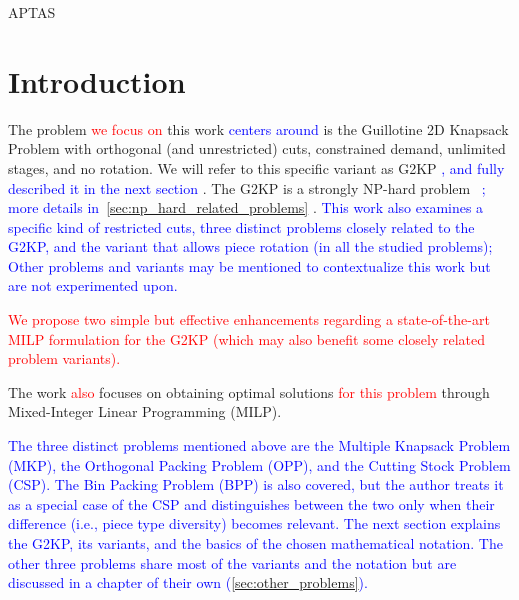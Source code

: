 \documentclass[ppgc,tese,english,formais,babel]{iiufrgs}
\newif\iffinalversion
\newcommand{\newtext}[1]{\iffinalversion%
#1%
\else%
\textcolor{blue}{#1}%
\fi%
}
\newcommand{\oldtext}[1]{\iffinalversion%
\else%
\textcolor{red}{#1}%
\fi%
}
\begin{document}

\listoftables

\begin{listofabbrv}{APTAS}

\end{listofabbrv}


\tableofcontents


\chapter{Introduction}

The problem \oldtext{we focus on} this work \newtext{centers around} is the Guillotine 2D Knapsack Problem with orthogonal (and unrestricted) cuts, constrained demand, unlimited stages, and no rotation.
We will refer to this specific variant as G2KP\newtext{, and fully described it in the next section}.
The G2KP is a strongly NP-hard problem~\newtext{\citep{korf:initial:2003,dolatabadi:2012}; more details in~\cref{sec:np_hard_related_problems}}.
\newtext{This work also examines a specific kind of restricted cuts, three distinct problems closely related to the G2KP, and the variant that allows piece rotation (in all the studied problems); Other problems and variants may be mentioned to contextualize this work but are not experimented upon.}
\oldtext{We propose two simple but effective enhancements regarding a state-of-the-art MILP formulation for the G2KP (which may also benefit some closely related problem variants).}
The work \oldtext{also} focuses on obtaining optimal solutions \oldtext{for this problem} through Mixed-Integer Linear Programming (MILP).

\newtext{
The three distinct problems mentioned above are the Multiple Knapsack Problem (MKP), the Orthogonal Packing Problem (OPP), and the Cutting Stock Problem (CSP). The Bin Packing Problem (BPP) is also covered, but the author treats it as a special case of the CSP and distinguishes between the two only when their difference (i.e., piece type diversity) becomes relevant.
The next section explains the G2KP, its variants, and the basics of the chosen mathematical notation.
The other three problems share most of the variants and the notation but are discussed in a chapter of their own (\cref{sec:other_problems}).
}
\end{document}
